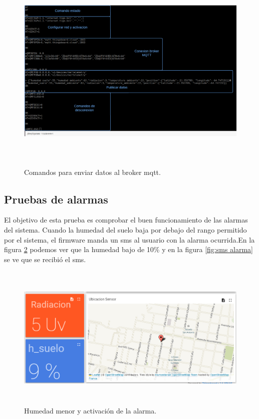\begin{figure}[h]
  \centering
    \includegraphics[width=12cm, height=10cm]{./Figures/secuencia de comandos shell.png}
  \caption{Comandos para enviar datos al broker mqtt.}
    \label{fig:secuencia de comandos shell}
\end{figure}

\subsection{Pruebas de alarmas}
El objetivo de esta prueba es comprobar el buen funcionamiento de las alarmas del sistema.
Cuando la humedad del suelo baja por debajo del rango permitido por el sistema, el firmware manda un sms al usuario con la alarma ocurrida.En la figura \ref{fig:humedad menor} podemos ver que la humedad bajo de 10\% y en la figura \ref{fig:sms alarma} se ve que se recibió el sms.

\begin{figure}[h!]
  \centering
    \includegraphics[width=\linewidth, height=7cm]{./Figures/humedad_menor2.png}
  \caption{Humedad menor y activación de la alarma.}
    \label{fig:humedad menor}
\end{figure}

